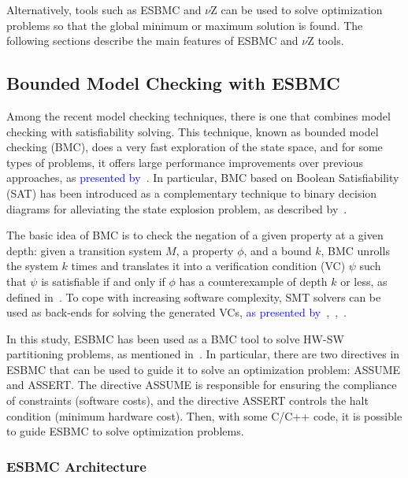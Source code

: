 \documentclass{doublecol-new}
\theoremstyle{TH}{
\newtheorem{lemma}{Lemma}
\newtheorem{theorem}[lemma]{Theorem}
\newtheorem{corrolary}[lemma]{Corrolary}
\newtheorem{conjecture}[lemma]{Conjecture}
\newtheorem{proposition}[lemma]{Proposition}
\newtheorem{claim}[lemma]{Claim}
\newtheorem{stheorem}[lemma]{Wrong Theorem}
\newtheorem{algorithm}{Algorithm}
}
\theoremstyle{THrm}{
\newtheorem{definition}{Definition}[section]
\newtheorem{question}{Question}[section]
\newtheorem{remark}{Remark}
\newtheorem{scheme}{Scheme}
}
\theoremstyle{THhit}{
\newtheorem{case}{Case}[section]
}
\begin{document}
Alternatively, tools such as ESBMC and $\nu$Z can be used to solve optimization problems so that the global minimum or maximum solution is found. The following sections describe the main features of ESBMC and $\nu$Z tools.

\subsection{Bounded Model Checking with ESBMC}
\label{Bounded-Model-Checking-with-ESBMC}

Among the recent model checking techniques, there is one that combines model checking with satisﬁability solving. This technique, known as bounded model checking (BMC), does a very fast exploration of the state space, and for some types of problems, it offers large performance improvements over previous approaches, as \textcolor{blue}{presented by}~\cite{Biere2009}. In particular, BMC based on Boolean Satisfiability (SAT) has been introduced as a complementary technique to binary decision diagrams for alleviating the state explosion problem, as described by~\cite{Clarke2001}. 

The basic idea of BMC is to check the negation of a given property at a given depth: given a transition system $M$, a property $\phi$, and a bound $k$, BMC unrolls the system $k$ times and translates it into a verification condition (VC) $\psi$  such that $\psi$ is satisfiable if and only if $\phi$ has a counterexample of depth $k$ or less, as defined in~\cite{Biere2009}. To cope with increasing software complexity, SMT solvers can be used as back-ends for solving the generated VCs, \textcolor{blue}{as presented by}~\cite{Cordeiro2012},~\cite{Armando2009},~\cite{Ganai2006}. 

In this study, ESBMC has been used as a BMC tool to solve HW-SW partitioning problems, as mentioned in~\cite{Cordeiro2012}. 
In particular, there are two directives in ESBMC that can be used to guide it to solve an optimization problem: ASSUME and ASSERT. The directive ASSUME is responsible for ensuring the compliance of constraints (software costs), and the directive ASSERT controls the halt condition (minimum hardware cost). Then, with some C/C++ code, it is possible to guide ESBMC to solve optimization problems.

\subsubsection{ESBMC Architecture}
\label{ESBMCArchitecture}
\end{document}
